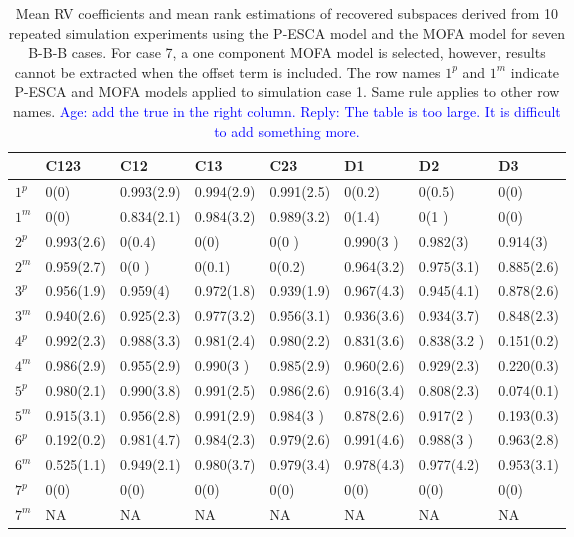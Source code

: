 \begin{table}[htbp]
\small
\centering
\caption{Mean RV coefficients and mean rank estimations of recovered subspaces derived from 10 repeated simulation experiments using the P-ESCA model and the MOFA model for seven B-B-B cases. For case 7, a one component MOFA model is selected, however, results cannot be extracted when the offset term is included. The row names $1^p$ and $1^m$ indicate P-ESCA and MOFA models applied to simulation case 1. Same rule applies to other row names. \textcolor{blue}{Age: add the true in the right column. Reply: The table is too large. It is difficult to add something more.}}
\label{chapter5_tab:3}
\begin{tabular}{llllllll}
  \toprule
  & C123 & C12 & C13 & C23 & D1 & D2 & D3 \\
  \midrule
 $1^{p}$  & 0(0)        & 0.993(2.9) & 0.994(2.9) & 0.991(2.5) & 0(0.2)     & 0(0.5)       & 0(0) \\
 $1^{m}$  & 0(0)        & 0.834(2.1) & 0.984(3.2) & 0.989(3.2) & 0(1.4)     & 0(1  )       & 0(0)  \\
 \hline
 $2^{p}$ & 0.993(2.6)  & 0(0.4)     & 0(0)       & 0(0  )     & 0.990(3  ) & 0.982(3)     & 0.914(3) \\
 $2^{m}$ & 0.959(2.7)  & 0(0  )     & 0(0.1)     & 0(0.2)     & 0.964(3.2) & 0.975(3.1)   & 0.885(2.6) \\
 \hline
 $3^{p}$ & 0.956(1.9)  & 0.959(4) & 0.972(1.8) & 0.939(1.9) & 0.967(4.3) & 0.945(4.1)   & 0.878(2.6) \\
 $3^{m}$ & 0.940(2.6)  & 0.925(2.3) & 0.977(3.2)   & 0.956(3.1) & 0.936(3.6) & 0.934(3.7)   & 0.848(2.3) \\
 \hline
 $4^{p}$ & 0.992(2.3)  & 0.988(3.3) & 0.981(2.4) & 0.980(2.2) & 0.831(3.6) & 0.838(3.2 )   & 0.151(0.2) \\
 $4^{m}$ & 0.986(2.9)  & 0.955(2.9) & 0.990(3  ) & 0.985(2.9) & 0.960(2.6) & 0.929(2.3)   & 0.220(0.3)      \\
 \hline
 $5^{p}$ & 0.980(2.1)  & 0.990(3.8) & 0.991(2.5)     & 0.986(2.6)   & 0.916(3.4) & 0.808(2.3)   & 0.074(0.1)\\
 $5^{m}$ & 0.915(3.1)  & 0.956(2.8) & 0.991(2.9)     & 0.984(3  )   & 0.878(2.6)   & 0.917(2  )   & 0.193(0.3)      \\
 \hline
 $6^{p}$ & 0.192(0.2)  & 0.981(4.7) & 0.984(2.3) & 0.979(2.6) & 0.991(4.6) & 0.988(3   )   & 0.963(2.8) \\
 $6^{m}$ & 0.525(1.1)  & 0.949(2.1) & 0.980(3.7) & 0.979(3.4)  & 0.978(4.3) & 0.977(4.2)   & 0.953(3.1) \\
 \hline
 $7^{p}$ & 0(0)        & 0(0)        & 0(0)        & 0(0)        & 0(0)        & 0(0)        & 0(0) \\
 $7^{m}$ & NA          & NA           & NA           & NA         & NA         &NA         & NA \\
  \bottomrule
\end{tabular}
\end{table}

